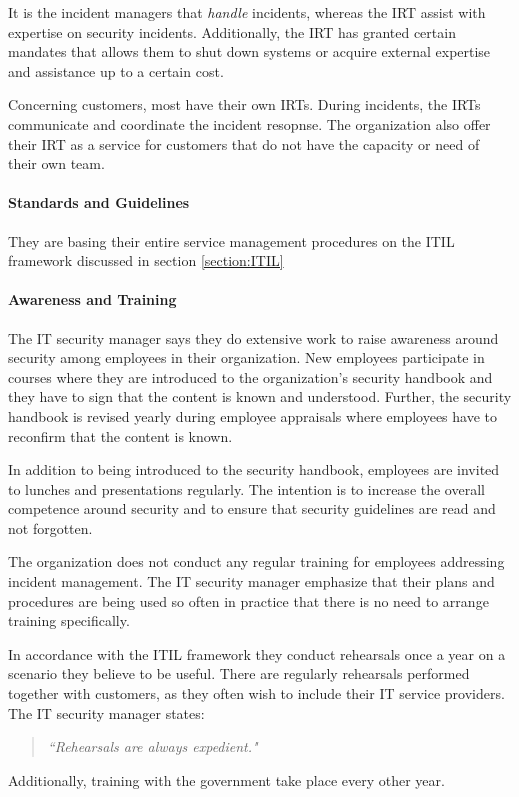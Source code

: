 It is the incident managers that \emph{handle} incidents, whereas the \ac{IRT} assist with expertise on security incidents. Additionally, the \ac{IRT} has granted certain mandates that allows them to shut down systems or acquire external expertise and assistance up to a certain cost.    

Concerning customers, most have their own \acp{IRT}. During incidents, the \acp{IRT} communicate and coordinate the incident resopnse. The organization also offer their \ac{IRT} as a service for customers that do not have the capacity or need of their own team. 

\paragraph{Standards and Guidelines}
They are basing their entire service management procedures on the ITIL framework discussed in section \ref{section:ITIL} 

\paragraph{Awareness and Training}
The IT security manager says they do extensive work to raise awareness around security among employees in their organization. New employees participate in courses where they are introduced to the organization's security handbook and they have to sign that the content is known and understood. Further, the security handbook is revised yearly during employee appraisals where employees have to reconfirm that the content is known.  

In addition to being introduced to the security handbook, employees are invited to lunches and presentations regularly. The intention is to increase the overall competence around security and to ensure that security guidelines are read and not forgotten. 

The organization does not conduct any regular training for employees addressing incident management. The IT security manager emphasize that their plans and procedures are being used so often in practice that there is no need to arrange training specifically. 

In accordance with the ITIL framework they conduct rehearsals once a year on a scenario they believe to be useful. There are regularly rehearsals performed   together with customers, as they often wish to include their IT service providers. The IT security manager states:
\begin{quote}
\textit{``Rehearsals are always expedient."}
\end{quote}
Additionally, training with the government take place every other year. 

